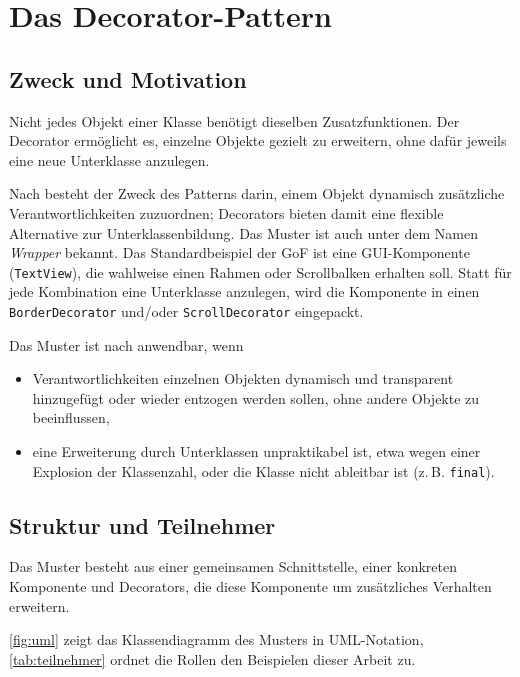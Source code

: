 \documentclass[a4paper,11pt,toc=listof,toc=bibliography]{scrartcl}
\begin{document}
\section{Das Decorator-Pattern}
\label{sec:decorator}

\subsection{Zweck und Motivation}
Nicht jedes Objekt einer Klasse benötigt dieselben Zusatzfunktionen. Der Decorator ermöglicht es, einzelne Objekte gezielt zu erweitern, ohne dafür jeweils eine neue Unterklasse anzulegen.

Nach \cite[S.~175]{GHJV94} besteht der Zweck des Patterns darin, einem Objekt dynamisch zusätzliche Verantwortlichkeiten zuzuordnen; Decorators bieten damit eine flexible Alternative zur Unterklassenbildung. Das Muster ist auch unter dem Namen \emph{Wrapper} bekannt. Das Standardbeispiel der \acs{GoF} ist eine GUI-Komponente (\texttt{TextView}), die wahlweise einen Rahmen oder Scrollbalken erhalten soll. Statt für jede Kombination eine Unterklasse anzulegen, wird die Komponente in einen \texttt{BorderDecorator} und/oder \texttt{ScrollDecorator} eingepackt.

Das Muster ist nach \cite{GHJV94} anwendbar, wenn
\begin{itemize}
  \item Verantwortlichkeiten einzelnen Objekten dynamisch und transparent hinzugefügt oder wieder entzogen werden sollen, ohne andere Objekte zu beeinflussen,
  \item eine Erweiterung durch Unterklassen unpraktikabel ist, etwa wegen einer Explosion der Klassenzahl, oder die Klasse nicht ableitbar ist (z.\,B. \texttt{final}).
\end{itemize}

\subsection{Struktur und Teilnehmer}
Das Muster besteht aus einer gemeinsamen Schnittstelle, einer konkreten Komponente und Decorators, die diese Komponente um zusätzliches Verhalten erweitern.

\autoref{fig:uml} zeigt das Klassendiagramm des Musters in \ac{UML}-Notation, \autoref{tab:teilnehmer} ordnet die Rollen den Beispielen dieser Arbeit zu.
\end{document}
